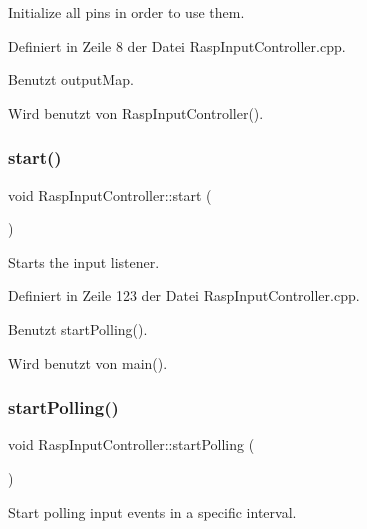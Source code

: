 Initialize all pins in order to use them. 



Definiert in Zeile 8 der Datei Rasp\+Input\+Controller.\+cpp.



Benutzt output\+Map.



Wird benutzt von Rasp\+Input\+Controller().

\mbox{\label{class_rasp_input_controller_a8cb185caa124285987d6b98122cfbea4}} 
\subsubsection{\texorpdfstring{start()}{start()}}
{\footnotesize\ttfamily void Rasp\+Input\+Controller\+::start (\begin{DoxyParamCaption}{ }\end{DoxyParamCaption})}

Starts the input listener. 

Definiert in Zeile 123 der Datei Rasp\+Input\+Controller.\+cpp.



Benutzt start\+Polling().



Wird benutzt von main().

\mbox{\label{class_rasp_input_controller_a7e15590d321b382fcb5f4d70959a5cbe}} 
\subsubsection{\texorpdfstring{start\+Polling()}{startPolling()}}
{\footnotesize\ttfamily void Rasp\+Input\+Controller\+::start\+Polling (\begin{DoxyParamCaption}{ }\end{DoxyParamCaption})\hspace{0.3cm}{\ttfamily [private]}}



Start polling input events in a specific interval. 



